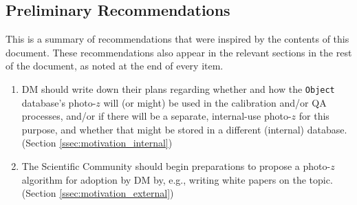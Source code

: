 \documentclass[DM,lsstdraft,toc]{lsstdoc}
\begin{document}
\subsection{Preliminary Recommendations}\label{ssec:intro_pr}

This is a summary of recommendations that were inspired by the contents of this document. These recommendations also appear in the relevant sections in the rest of the document, as noted at the end of every item.

\begin{enumerate}
\item DM should write down their plans regarding whether and how the \texttt{Object} database's photo-$z$ will (or might) be used in the calibration and/or QA processes, and/or if there will be a separate, internal-use photo-$z$ for this purpose, and whether that might be stored in a different (internal) database. (Section \ref{ssec:motivation_internal})
\item The Scientific Community should begin preparations to propose a photo-$z$ algorithm for adoption by DM by, e.g., writing white papers on the topic. (Section \ref{ssec:motivation_external})

\end{enumerate}
\end{document}
